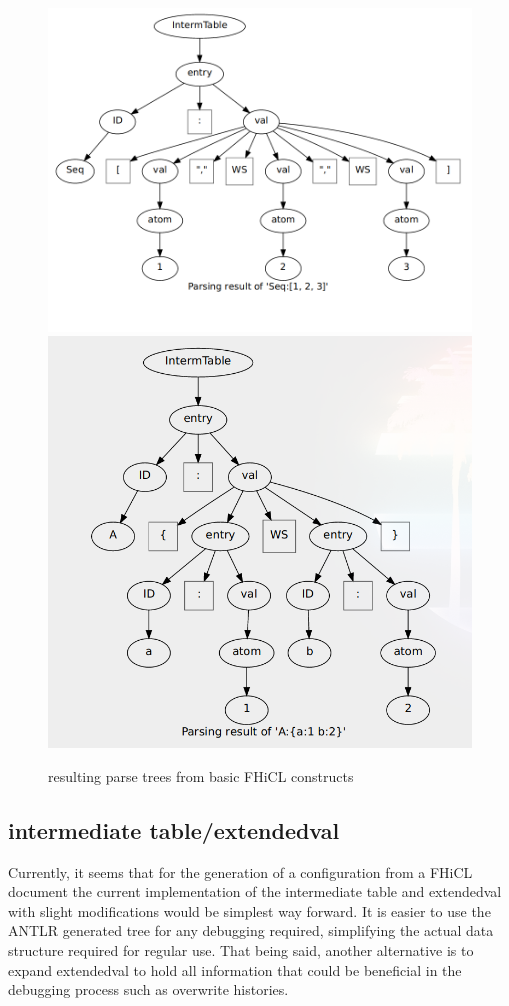 \documentclass{article}
\begin{document}
\begin{figure}[!htbp]
\begin{center}
        \includegraphics{Sequence.png}
        \includegraphics{Table.png}
        \caption{resulting parse trees from basic FHiCL constructs}
        \label{fig:exampleTrees}
      \end{center}
    \end{figure}
	

	\subsection{intermediate table/extendedval}
		\quad Currently, it seems that for the generation of a configuration from a FHiCL document the current implementation of the intermediate table and extendedval with slight modifications would be simplest way forward. It is easier to use the ANTLR generated tree for any debugging required, simplifying the actual data structure required for regular use. That being said, another alternative is to expand extendedval to hold all information that could be beneficial in the debugging process such as overwrite histories.
\end{document}
